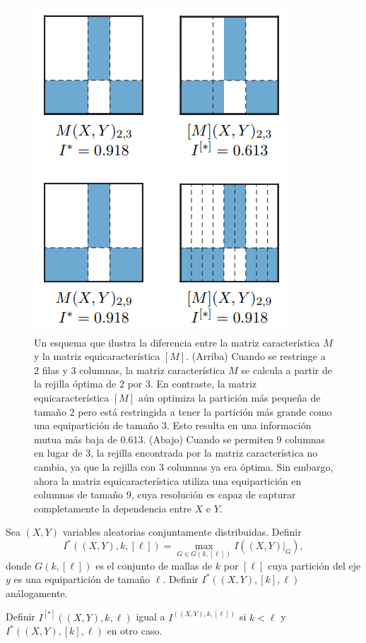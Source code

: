         \begin{figure} 
            \centering
            \includegraphics[scale=0.8]{figuras/figure_1_reshef_2016.png}
            \caption{Un esquema que ilustra la diferencia entre la matriz caracter\'istica $M$ y la matriz equicaracter\'istica $[M]$. (Arriba) Cuando se restringe a 2 filas y 3 columnas, la matriz caracter\'istica $M$ se calcula a partir de la rejilla \'optima de 2 por 3. En contraste, la matriz equicaracter\'istica $[M]$ a\'un optimiza la partici\'on m\'as peque\~na de tama\~no 2 pero est\'a restringida a tener la partici\'on m\'as grande como una equipartici\'on de tama\~no 3. Esto resulta en una informaci\'on mutua m\'as baja de 0.613. (Abajo) Cuando se permiten 9 columnas en lugar de 3, la rejilla encontrada por la matriz caracter\'istica no cambia, ya que la rejilla con 3 columnas ya era \'optima. Sin embargo, ahora la matriz equicaracter\'istica utiliza una equipartici\'on en columnas de tama\~no 9, cuya resoluci\'on es capaz de capturar completamente la dependencia entre $X$ e $Y$.}
            \label{fig:matriz_equicaracteristica}
        \end{figure}
        
    
        \begin{defn}
            Sea $(X, Y)$ variables aleatorias conjuntamente distribuidas. Definir
            $$
            I^*((X, Y), k,[\ell])=\max _{G \in G(k,[\ell])} I\left(\left.(X, Y)\right|_G\right),
            $$
            donde $G(k,[\ell])$ es el conjunto de mallas de $k$ por $[\ell]$ cuya partici\'on del eje $y$ es una equipartici\'on de tama\~no $\ell$. Definir $I^*((X, Y),[k], \ell)$ an\'alogamente.
    
            Definir $I^{[*]}((X, Y), k, \ell)$ igual a $I^((X, Y), k,[\ell])$ si $k<\ell$ y $I^*((X, Y),[k], \ell)$ en otro caso.
        \end{defn}
    
